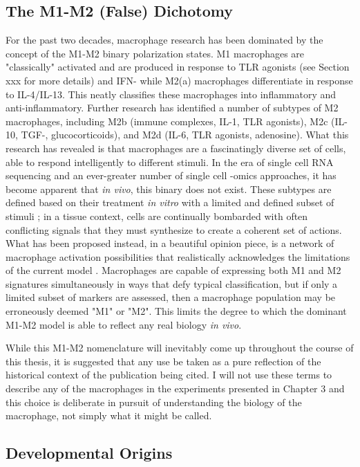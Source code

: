 \subsection{The M1-M2 (False) Dichotomy}\label{lies}

For the past two decades, macrophage research has been dominated by the concept of the M1-M2 binary polarization states. M1 macrophages are "classically" activated and are produced in response to TLR agonists (see Section xxx for more details) and IFN-\textgamma{} while M2(a) macrophages differentiate in response to IL-4/IL-13. This neatly classifies these macrophages into inflammatory and anti-inflammatory. Further research has identified a number of subtypes of M2 macrophages, including M2b (immune complexes, IL-1, TLR agonists), M2c (IL-10, TGF-\textbeta, glucocorticoids), and M2d (IL-6, TLR agonists, adenosine). What this research has revealed is that macrophages are a fascinatingly diverse set of cells, able to respond intelligently to different stimuli. In the era of single cell RNA sequencing and an ever-greater number of single cell -omics approaches, it has become apparent that \textit{in vivo}, this binary does not exist. These subtypes are defined based on their treatment \textit{in vitro} with a limited and defined subset of stimuli \citep{Gosselin2014}; in a tissue context, cells are continually bombarded with often conflicting signals that they must synthesize to create a coherent set of actions. What has been proposed instead, in a beautiful opinion piece, is a network of macrophage activation possibilities that realistically acknowledges the limitations of the current model \citep{Nahrendorf2016}. Macrophages are capable of expressing both M1 and M2 signatures simultaneously in ways that defy typical classification, but if only a limited subset of markers are assessed, then a macrophage population may be erroneously deemed "M1" or "M2". This limits the degree to which the dominant M1-M2 model is able to reflect any real biology \textit{in vivo}. 

While this M1-M2 nomenclature will inevitably come up throughout the course of this thesis, it is suggested that any use be taken as a pure reflection of the historical context of the publication being cited. I will not use these terms to describe any of the macrophages in the experiments presented in Chapter 3 and this choice is deliberate in pursuit of understanding the biology of the macrophage, not simply what it might be called.

\subsection{Developmental Origins}\label{macdev}

